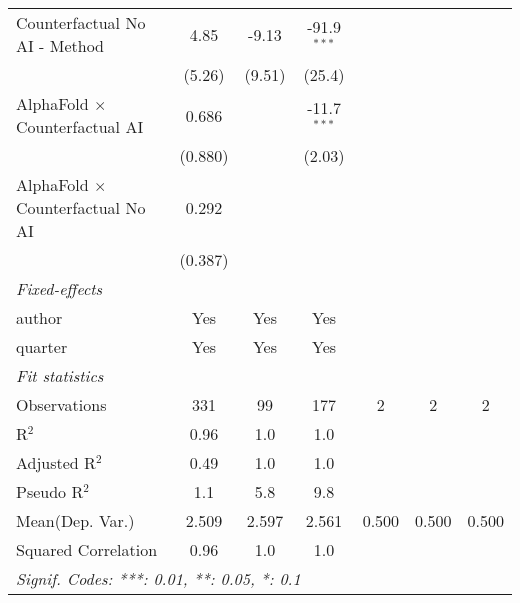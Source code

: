 \begin{tabular}{lcccccc}
   Counterfactual No AI - Method            & 4.85         & -9.13          & -91.9$^{***}$  &     &     &   \\   
                                            & (5.26)       & (9.51)         & (25.4)         &     &     &   \\   
   AlphaFold $\times$ Counterfactual AI     & 0.686        &                & -11.7$^{***}$  &     &     &   \\   
                                            & (0.880)      &                & (2.03)         &     &     &   \\   
   AlphaFold $\times$ Counterfactual No AI  & 0.292        &                &                &     &     &   \\   
                                            & (0.387)      &                &                &     &     &   \\   
   \midrule
   \emph{Fixed-effects}\\
   author                                   & Yes          & Yes            & Yes            &     &     & \\  
   quarter                                  & Yes          & Yes            & Yes            &     &     & \\  
   \midrule
   \emph{Fit statistics}\\
   Observations                             & 331          & 99             & 177            & 2   & 2   & 2\\  
   R$^2$                                    & 0.96         & 1.0            & 1.0            &     &     & \\  
   Adjusted R$^2$                           & 0.49         & 1.0            & 1.0            &     &     & \\  
   Pseudo R$^2$                             & 1.1          & 5.8            & 9.8            &     &     & \\  
Mean(Dep. Var.) & 2.509 & 2.597 & 2.561 & 0.500 & 0.500 & 0.500 \\
   Squared Correlation                      & 0.96         & 1.0            & 1.0            &     &     & \\  
   \midrule \midrule
   \multicolumn{7}{l}{\emph{Signif. Codes: ***: 0.01, **: 0.05, *: 0.1}}\\
\end{tabular}
\par\endgroup
